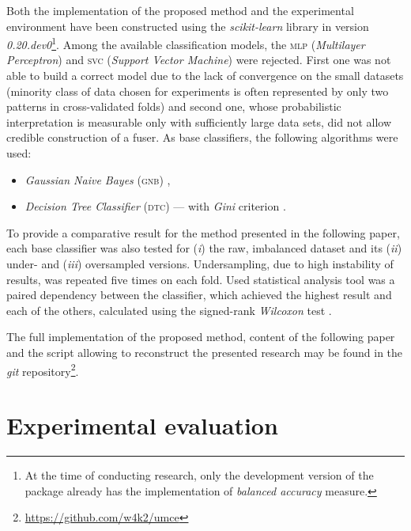\documentclass[pmlr]{jmlr}
\begin{document}
Both the implementation of the proposed method and the experimental environment have been constructed using the \emph{scikit-learn} library \citep{scikit-learn} in version \emph{0.20.dev0}\footnote{At the time of conducting research, only the development version of the package already has the implementation of \emph{balanced accuracy} measure.}. Among the available classification models, the \textsc{mlp} (\emph{Multilayer Perceptron}) and \textsc{svc} (\emph{Support Vector Machine}) were rejected. First one was not able to build a correct model due to the lack of convergence on the small datasets (minority class of data chosen for experiments is often represented by only two patterns in cross-validated folds) and second one, whose probabilistic interpretation is measurable only with sufficiently large data sets, did not allow credible construction of a fuser. As base classifiers, the following algorithms were used:

\begin{itemize}
	\item \emph{Gaussian Naive Bayes} (\textsc{gnb}) \citep{gnb},
	\item \emph{Decision Tree Classifier} (\textsc{dtc}) --- with \emph{Gini} criterion \citep{loh2011classification}.
\end{itemize}

To provide a comparative result for the method presented in the following paper, each base classifier was also tested for (\emph{i}) the raw, imbalanced dataset and its (\emph{ii}) under- and (\emph{iii}) oversampled versions. Undersampling, due to high instability of results, was repeated five times on each fold. Used statistical analysis tool was a paired dependency between the classifier, which achieved the highest result and each of the others, calculated using the signed-rank \emph{Wilcoxon} test \citep{wilcoxon1945individual}.

The full implementation of the proposed method, content of the following paper and the script allowing to reconstruct the presented research may be found in the \emph{git} repository\footnote{\url{https://github.com/w4k2/umce}}.

\section{Experimental evaluation}
\label{sec:intro}
\end{document}
